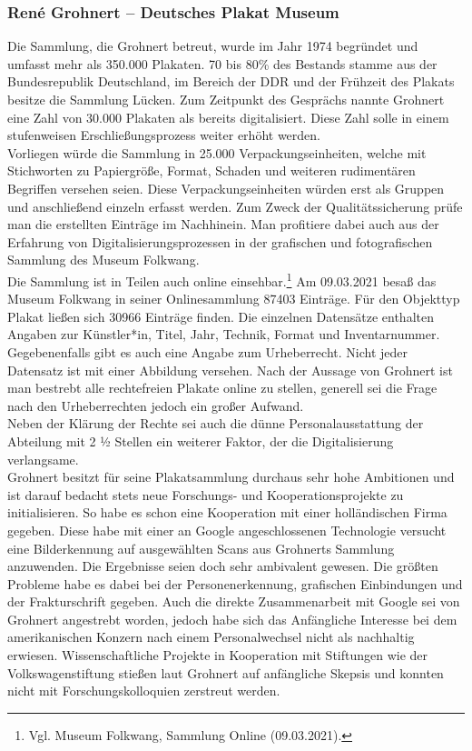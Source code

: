 \documentclass[a4paper,12pt,ngerman]{article}
\begin{document}
\subsubsection{René Grohnert – Deutsches Plakat Museum}
Die Sammlung, die Grohnert betreut, wurde im Jahr 1974 begründet und umfasst mehr als 350.000 Plakaten. 70 bis 80\% des Bestands stamme aus der Bundesrepublik Deutschland, im Bereich der DDR und der Frühzeit des Plakats besitze die Sammlung Lücken. Zum Zeitpunkt des Gesprächs nannte Grohnert eine Zahl von 30.000 Plakaten als bereits digitalisiert. Diese Zahl solle in einem stufenweisen Erschließungsprozess weiter erhöht werden. \\
Vorliegen würde die Sammlung in 25.000 Verpackungseinheiten, welche mit Stichworten zu Papiergröße, Format, Schaden und weiteren rudimentären Begriffen versehen seien. Diese Verpackungseinheiten würden erst als Gruppen und anschließend einzeln erfasst werden. Zum Zweck der Qualitätssicherung prüfe man die erstellten Einträge im Nachhinein. Man profitiere dabei auch aus der Erfahrung von Digitalisierungsprozessen in der grafischen und fotografischen Sammlung des Museum Folkwang. \\
Die Sammlung ist in Teilen auch online einsehbar.\footnote{Vgl. Museum Folkwang, Sammlung Online (09.03.2021).}  Am 09.03.2021 besaß das Museum Folkwang in seiner Onlinesammlung 87403 Einträge. Für den Objekttyp Plakat ließen sich 30966 Einträge finden. Die einzelnen Datensätze enthalten Angaben zur Künstler*in, Titel, Jahr, Technik, Format und Inventarnummer. Gegebenenfalls gibt es auch eine Angabe zum Urheberrecht. Nicht jeder Datensatz ist mit einer Abbildung versehen. Nach der Aussage von Grohnert ist man bestrebt alle rechtefreien Plakate online zu stellen, generell sei die Frage nach den Urheberrechten jedoch ein großer Aufwand. \\
Neben der Klärung der Rechte sei auch die dünne Personalausstattung der Abteilung mit 2 ½ Stellen ein weiterer Faktor, der die Digitalisierung verlangsame. \\
Grohnert besitzt für seine Plakatsammlung durchaus sehr hohe Ambitionen und ist darauf bedacht stets neue Forschungs- und Kooperationsprojekte zu initialisieren. So habe es schon eine Kooperation mit einer holländischen Firma gegeben. Diese habe mit einer an Google angeschlossenen Technologie versucht eine Bilderkennung auf ausgewählten Scans aus Grohnerts Sammlung anzuwenden. Die Ergebnisse seien doch sehr ambivalent gewesen. Die größten Probleme habe es dabei bei der Personenerkennung, grafischen Einbindungen und der Frakturschrift gegeben. Auch die direkte Zusammenarbeit mit Google sei von Grohnert angestrebt worden, jedoch habe sich das Anfängliche Interesse bei dem amerikanischen Konzern nach einem Personalwechsel nicht als nachhaltig erwiesen. Wissenschaftliche Projekte in Kooperation mit Stiftungen wie der Volkswagenstiftung stießen laut Grohnert auf anfängliche Skepsis und konnten nicht mit Forschungskolloquien zerstreut werden. \\
\end{document}

